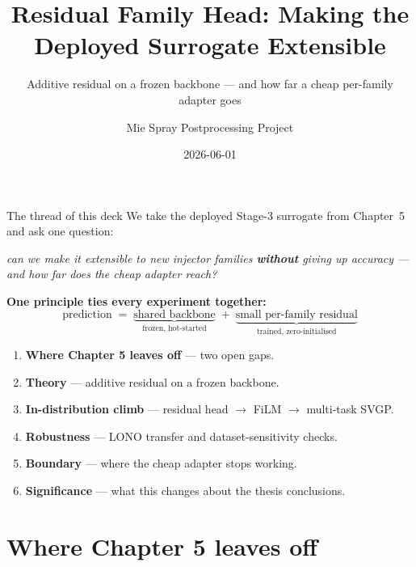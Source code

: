 \documentclass[UTF8,aspectratio=169]{ctexbeamer}
\title[Residual Family Head]{Residual Family Head: Making the Deployed Surrogate Extensible}
\subtitle{Additive residual on a frozen backbone --- and how far a cheap per-family adapter goes}
\author{Mie Spray Postprocessing Project}
\date{2026-06-01}
\begin{document}
\begin{frame}
  \titlepage
\end{frame}

\begin{frame}{The thread of this deck}
\small
We take the deployed Stage-3 surrogate from Chapter~5 and ask one question:
\begin{center}
\emph{can we make it extensible to new injector families \textbf{without} giving up
accuracy --- and how far does the cheap adapter reach?}
\end{center}

\vspace{0.4em}
\textbf{One principle ties every experiment together:}
\[
  \boxed{\ \text{prediction} \;=\; \underbrace{\text{shared backbone}}_{\text{frozen, hot-started}}
  \;+\; \underbrace{\text{small per-family residual}}_{\text{trained, zero-initialised}}\ }
\]

\vspace{0.4em}
\begin{enumerate}\setlength\itemsep{2pt}
  \item \textbf{Where Chapter 5 leaves off} --- two open gaps.
  \item \textbf{Theory} --- additive residual on a frozen backbone.
  \item \textbf{In-distribution climb} --- residual head $\to$ FiLM $\to$ multi-task SVGP.
  \item \textbf{Robustness} --- LONO transfer and dataset-sensitivity checks.
  \item \textbf{Boundary} --- where the cheap adapter stops working.
  \item \textbf{Significance} --- what this changes about the thesis conclusions.
\end{enumerate}
\end{frame}

\section{Where Chapter 5 leaves off}
\end{document}
